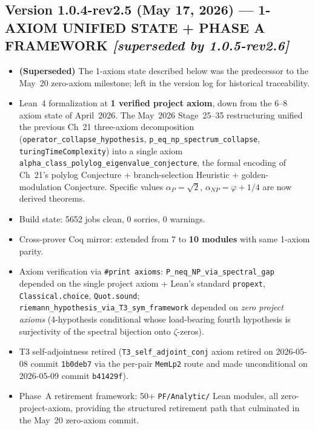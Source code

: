\subsection*{Version 1.0.4-rev2.5 (May 17, 2026) --- 1-AXIOM UNIFIED STATE + PHASE A FRAMEWORK \emph{[superseded by 1.0.5-rev2.6]}}
\begin{itemize}
\item \textbf{(Superseded)} The 1-axiom state described below was the predecessor to the May~20 zero-axiom milestone; left in the version log for historical traceability.
\item Lean~4 formalization at \textbf{1 verified project axiom}, down from the 6--8 axiom state of April~2026. The May~2026 Stage~25--35 restructuring unified the previous Ch~21 three-axiom decomposition (\texttt{operator\_collapse\_hypothesis}, \texttt{p\_eq\_np\_spectrum\_collapse}, \texttt{turingTimeComplexity}) into a single axiom \texttt{alpha\_class\_polylog\_eigenvalue\_conjecture}, the formal encoding of Ch~21's polylog Conjecture + branch-selection Heuristic + golden-modulation Conjecture. Specific values $\alpha_P = \sqrt{2}$, $\alpha_{NP} = \varphi + 1/4$ are now derived theorems.
\item Build state: 5652 jobs clean, 0 sorries, 0 warnings.
\item Cross-prover Coq mirror: extended from 7 to \textbf{10 modules} with same 1-axiom parity.
\item Axiom verification via \texttt{\#print axioms}: \texttt{P\_neq\_NP\_via\_spectral\_gap} depended on the single project axiom + Lean's standard \texttt{propext}, \texttt{Classical.choice}, \texttt{Quot.sound}; \texttt{riemann\_hypothesis\_via\_T3\_sym\_framework} depended on \emph{zero project axioms} (4-hypothesis conditional whose load-bearing fourth hypothesis is surjectivity of the spectral bijection onto $\zeta$-zeros).
\item T3 self-adjointness retired (\texttt{T3\_self\_adjoint\_conj} axiom retired on 2026-05-08 commit \texttt{1b0deb7} via the per-pair \texttt{MemLp2} route and made unconditional on 2026-05-09 commit \texttt{b41429f}).
\item Phase~A retirement framework: 50+ \texttt{PF/Analytic/} Lean modules, all zero-project-axiom, providing the structured retirement path that culminated in the May~20 zero-axiom commit.
\end{itemize}

